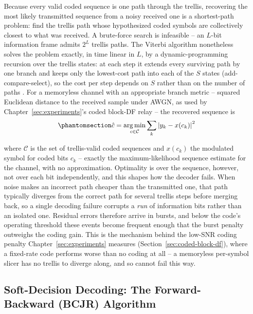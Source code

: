 Because every valid coded sequence is one path through the trellis, recovering the most likely transmitted sequence from a noisy received one is a shortest-path problem: find the trellis path whose hypothesized coded symbols are collectively closest to what was received. A brute-force search is infeasible -- an $L$-bit information frame admits $2^{L}$ trellis paths. The Viterbi algorithm nonetheless solves the problem exactly, in time linear in $L$, by a dynamic-programming recursion over the trellis states: at each step it extends every surviving path by one branch and keeps only the lowest-cost path into each of the $S$ states (add-compare-select), so the cost per step depends on $S$ rather than on the number of paths \cite{Forney1972MLSE, ProakisSalehi2008DigitalComm}. For a memoryless channel with an appropriate branch metric -- squared Euclidean distance to the received sample under AWGN, as used by Chapter~\ref{sec:experiments}'s coded block-DF relay \cite{Forney1972MLSE} -- the recovered sequence is
\begin{equation}\protect\phantomsection\label{eq:viterbi-ml-metric}{\hat{c} = \operatorname*{arg\,min}_{c \in \mathcal{C}} \sum_{k} \left| y_k - x(c_k) \right|^2}\end{equation}

where $\mathcal{C}$ is the set of trellis-valid coded sequences and $x(c_k)$ the modulated symbol for coded bits $c_k$ -- exactly the maximum-likelihood sequence estimate for the channel, with no approximation. Optimality is over the sequence, however, not over each bit independently, and this shapes how the decoder fails. When noise makes an incorrect path cheaper than the transmitted one, that path typically diverges from the correct path for several trellis steps before merging back, so a single decoding failure corrupts a \emph{run} of information bits rather than an isolated one. Residual errors therefore arrive in bursts, and below the code's operating threshold these events become frequent enough that the burst penalty outweighs the coding gain. This is the mechanism behind the low-SNR coding penalty Chapter~\ref{sec:experiments} measures (Section~\ref{sec:coded-block-df}), where a fixed-rate code performs worse than no coding at all -- a memoryless per-symbol slicer has no trellis to diverge along, and so cannot fail this way.

\subsection{Soft-Decision Decoding: The Forward-Backward (BCJR) Algorithm}\label{sec:soft-decision-bcjr-decoding}

